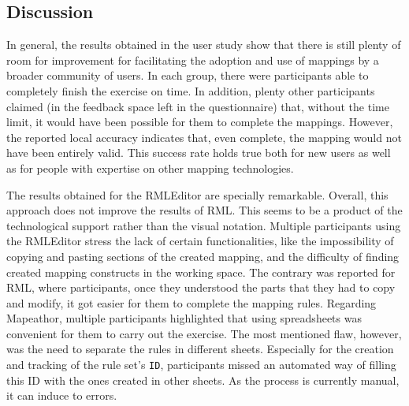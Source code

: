 








\subsection{Discussion}
\label{sec:chp5_mapeathor_discussion}

In general, the results obtained in the user study show that there is still plenty of room for improvement for facilitating the adoption and use of mappings by a broader community of users. In each group, there were participants able to completely finish the exercise on time. In addition, plenty other participants claimed (in the feedback space left in the questionnaire) that, without the time limit, it would have been possible for them to complete the mappings. However, the reported local accuracy indicates that, even complete, the mapping would not have been entirely valid. This success rate holds true both for new users as well as for people with expertise on other mapping technologies. 

The results obtained for the RMLEditor are specially remarkable. Overall, this approach does not improve the results of RML. This seems to be a product of the technological support rather than the visual notation. Multiple participants using the RMLEditor stress the lack of certain functionalities, like the impossibility of copying and pasting sections of the created mapping, and the difficulty of finding created mapping constructs in the working space. The contrary was reported for RML, where participants, once they understood the parts that they had to copy and modify, it got easier for them to complete the mapping rules. Regarding Mapeathor, multiple participants highlighted that using spreadsheets was convenient for them to carry out the exercise. The most mentioned flaw, however, was the need to separate the rules in different sheets. Especially for the creation and tracking of the rule set's \texttt{ID}, participants missed an automated way of filling this ID with the ones created in other sheets. As the process is currently manual, it can induce to errors.

